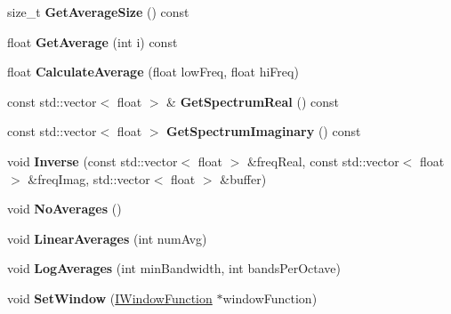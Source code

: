\begin{DoxyCompactItemize}
size\+\_\+t {\bfseries Get\+Average\+Size} () const
\item 
\mbox{\label{class_i_fourier_transform_a653056cd938325ead0b452be4cc7e1ed}} 
float {\bfseries Get\+Average} (int i) const
\item 
\mbox{\label{class_i_fourier_transform_af439467899cd48422f0199a83015eeda}} 
float {\bfseries Calculate\+Average} (float low\+Freq, float hi\+Freq)
\item 
\mbox{\label{class_i_fourier_transform_a3da319ccaa42225a22cc8334906e91ce}} 
const std\+::vector$<$ float $>$ \& {\bfseries Get\+Spectrum\+Real} () const
\item 
\mbox{\label{class_i_fourier_transform_a0d24f101db9e6191c011f3a7c81de11f}} 
const std\+::vector$<$ float $>$ {\bfseries Get\+Spectrum\+Imaginary} () const
\item 
\mbox{\label{class_i_fourier_transform_a87ee273cc9b7e83774a78dc7a25cc645}} 
void {\bfseries Inverse} (const std\+::vector$<$ float $>$ \&freq\+Real, const std\+::vector$<$ float $>$ \&freq\+Imag, std\+::vector$<$ float $>$ \&buffer)
\item 
\mbox{\label{class_i_fourier_transform_adcbde0d27deaa9effff8b10ba0202f95}} 
void {\bfseries No\+Averages} ()
\item 
\mbox{\label{class_i_fourier_transform_a0e74b95250661319512776c0e2ba9aeb}} 
void {\bfseries Linear\+Averages} (int num\+Avg)
\item 
\mbox{\label{class_i_fourier_transform_aff06c88d7195c1d4b84e1a34d50e4f99}} 
void {\bfseries Log\+Averages} (int min\+Bandwidth, int bands\+Per\+Octave)
\item 
\mbox{\label{class_i_fourier_transform_adb8c00f0b10e6af8cfc00ed0be8c803f}} 
void {\bfseries Set\+Window} (\hyperlink{class_i_window_function}{I\+Window\+Function} $\ast$window\+Function)
\end{DoxyCompactItemize}
